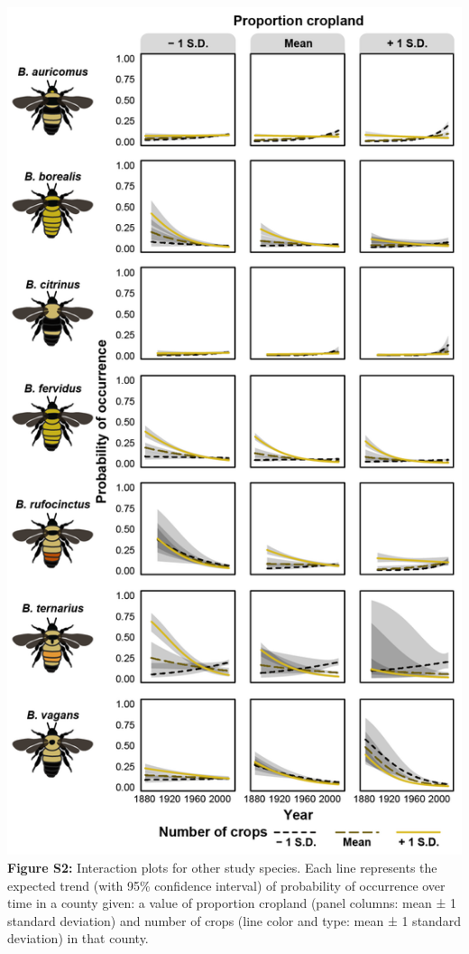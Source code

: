 \documentclass[11pt,]{article}
\begin{document}
\includegraphics[width=1\textwidth,height=\textheight]{../ms_figs/fig_s2.png}
\textbf{Figure S2:} Interaction plots for other study species. Each line
represents the expected trend (with 95\% confidence interval) of
probability of occurrence over time in a county given: a value of
proportion cropland (panel columns: mean ± 1 standard deviation) and
number of crops (line color and type: mean ± 1 standard deviation) in
that county. \clearpage
\end{document}
